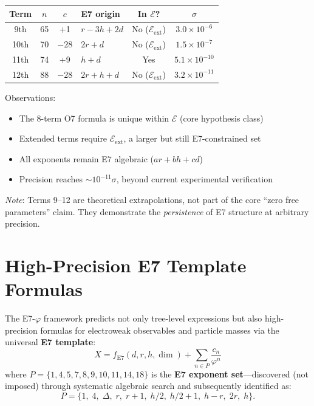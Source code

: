 \documentclass[11pt,a4paper]{article}
\begin{document}
\begin{center}
\begin{tabular}{|c|c|c|l|c|c|}
\hline
\textbf{Term} & \textbf{$n$} & \textbf{$c$} & \textbf{E7 origin} & \textbf{In $\mathcal{E}$?} & \textbf{$\sigma$} \\
\hline
9th & 65 & +1 & $r-3h+2d$ & No ($\mathcal{E}_{\text{ext}}$) & $3.0 \times 10^{-6}$ \\
10th & 70 & $-28$ & $2r+d$ & No ($\mathcal{E}_{\text{ext}}$) & $1.5 \times 10^{-7}$ \\
11th & 74 & +9 & $h+d$ & Yes & $5.1 \times 10^{-10}$ \\
12th & 88 & $-28$ & $2r+h+d$ & No ($\mathcal{E}_{\text{ext}}$) & $3.2 \times 10^{-11}$ \\
\hline
\end{tabular}
\end{center}

Observations:
\begin{itemize}
\item The 8-term O7 formula is unique within $\mathcal{E}$ (core hypothesis class)
\item Extended terms require $\mathcal{E}_{\text{ext}}$, a larger but still E7-constrained set
\item All exponents remain E7 algebraic ($ar + bh + cd$)
\item Precision reaches $\sim 10^{-11}\sigma$, beyond current experimental verification
\end{itemize}

\textit{Note}: Terms 9--12 are theoretical extrapolations, not part of the core ``zero free parameters'' claim. They demonstrate the \textit{persistence} of E7 structure at arbitrary precision.

\section{High-Precision E7 Template Formulas}
\label{sec:e7-template}

The E7-$\varphi$ framework predicts not only tree-level expressions but also high-precision formulas for electroweak observables and particle masses via the universal \textbf{E7 template}:
\begin{equation}
\boxed{X = f_{\text{E7}}(d,r,h,\dim) + \sum_{n \in P} \frac{c_n}{\varphi^n}}
\label{eq:e7-template-master}
\end{equation}
where $P = \{1, 4, 5, 7, 8, 9, 10, 11, 14, 18\}$ is the \textbf{E7 exponent set}---discovered (not imposed) through systematic algebraic search and subsequently identified as:
\[
P = \{1,\; 4,\; \Delta,\; r,\; r{+}1,\; h/2,\; h/2{+}1,\; h{-}r,\; 2r,\; h\}.
\]
\end{document}
